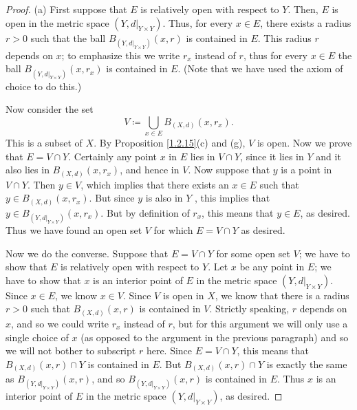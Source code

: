 \begin{proof}{(a)}
    First suppose that \(E\) is relatively open with respect to \(Y\).
    Then, \(E\) is open in the metric space \((Y, d|_{Y \times Y})\).
    Thus, for every \(x \in E\), there exists a radius \(r > 0\) such that the ball \(B_{(Y, d|_{Y \times Y})}(x, r)\) is contained in \(E\).
    This radius \(r\) depends on \(x\);
    to emphasize this we write \(r_x\) instead of \(r\), thus for every \(x \in E\) the ball \(B_{(Y, d|_{Y \times Y})}(x, r_x)\) is contained in \(E\).
    (Note that we have used the axiom of choice to do this.)

    Now consider the set
    \[
        V \coloneqq \bigcup_{x \in E} B_{(X, d)}(x, r_x).
    \]
    This is a subset of \(X\).
    By Proposition \ref{1.2.15}(c) and (g), \(V\) is open.
    Now we prove that \(E = V \cap Y\).
    Certainly any point \(x\) in \(E\) lies in \(V \cap Y\), since it lies in \(Y\) and it also lies in \(B_{(X, d)}(x, r_x)\), and hence in \(V\).
    Now suppose that \(y\) is a point in \(V \cap Y\).
    Then \(y \in V\), which implies that there exists an \(x \in E\) such that \(y \in B_{(X, d)}(x, r_x)\).
    But since \(y\) is also in \(Y\) , this implies that \(y \in B_{(Y, d|_{Y \times Y})}(x, r_x)\).
    But by definition of \(r_x\), this means that \(y \in E\), as desired.
    Thus we have found an open set \(V\) for which \(E = V \cap Y\) as desired.

    Now we do the converse.
    Suppose that \(E = V \cap Y\) for some open set \(V\);
    we have to show that \(E\) is relatively open with respect to \(Y\).
    Let \(x\) be any point in \(E\);
    we have to show that \(x\) is an interior point of \(E\) in the metric space \((Y, d|_{Y \times Y})\).
    Since \(x \in E\), we know \(x \in V\).
    Since \(V\) is open in \(X\), we know that there is a radius \(r > 0\) such that \(B_{(X, d)}(x, r)\) is contained in \(V\).
    Strictly speaking, \(r\) depends on \(x\), and so we could write \(r_x\) instead of \(r\), but for this argument we will only use a single choice of \(x\) (as opposed to the argument in the previous paragraph) and so we will not bother to subscript \(r\) here.
    Since \(E = V \cap Y\), this means that \(B_{(X, d)}(x, r) \cap Y\) is contained in \(E\).
    But \(B_{(X, d)}(x, r) \cap Y\) is exactly the same as \(B_{(Y, d|_{Y \times Y})}(x, r)\), and so \(B_{(Y, d|_{Y \times Y})}(x, r)\) is contained in \(E\).
    Thus \(x\) is an interior point of \(E\) in the metric space \((Y, d|_{Y \times Y})\), as desired.
\end{proof}

